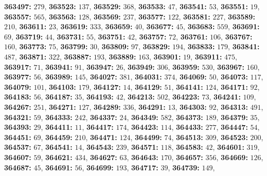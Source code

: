 \textsf{\bfseries 363497:} $279$, \textsf{\bfseries 363523:} $137$, \textsf{\bfseries 363529:} $368$, \textsf{\bfseries 363533:} $47$, \textsf{\bfseries 363541:} $53$, \textsf{\bfseries 363551:} $19$, \textsf{\bfseries 363557:} $565$, \textsf{\bfseries 363563:} $128$, \textsf{\bfseries 363569:} $237$, \textsf{\bfseries 363577:} $122$, \textsf{\bfseries 363581:} $227$, \textsf{\bfseries 363589:} $210$, \textsf{\bfseries 363611:} $23$, \textsf{\bfseries 363619:} $333$, \textsf{\bfseries 363659:} $40$, \textsf{\bfseries 363677:} $45$, \textsf{\bfseries 363683:} $559$, \textsf{\bfseries 363691:} $69$, \textsf{\bfseries 363719:} $44$, \textsf{\bfseries 363731:} $55$, \textsf{\bfseries 363751:} $42$, \textsf{\bfseries 363757:} $72$, \textsf{\bfseries 363761:} $106$, \textsf{\bfseries 363767:} $160$, \textsf{\bfseries 363773:} $75$, \textsf{\bfseries 363799:} $30$, \textsf{\bfseries 363809:} $97$, \textsf{\bfseries 363829:} $194$, \textsf{\bfseries 363833:} $179$, \textsf{\bfseries 363841:} $487$, \textsf{\bfseries 363871:} $322$, \textsf{\bfseries 363887:} $193$, \textsf{\bfseries 363889:} $163$, \textsf{\bfseries 363901:} $19$, \textsf{\bfseries 363911:} $475$, \textsf{\bfseries 363917:} $71$, \textsf{\bfseries 363941:} $91$, \textsf{\bfseries 363947:} $26$, \textsf{\bfseries 363949:} $306$, \textsf{\bfseries 363959:} $530$, \textsf{\bfseries 363967:} $160$, \textsf{\bfseries 363977:} $56$, \textsf{\bfseries 363989:} $145$, \textsf{\bfseries 364027:} $381$, \textsf{\bfseries 364031:} $374$, \textsf{\bfseries 364069:} $50$, \textsf{\bfseries 364073:} $117$, \textsf{\bfseries 364079:} $101$, \textsf{\bfseries 364103:} $179$, \textsf{\bfseries 364127:} $14$, \textsf{\bfseries 364129:} $51$, \textsf{\bfseries 364141:} $124$, \textsf{\bfseries 364171:} $92$, \textsf{\bfseries 364183:} $56$, \textsf{\bfseries 364187:} $35$, \textsf{\bfseries 364193:} $42$, \textsf{\bfseries 364213:} $502$, \textsf{\bfseries 364223:} $73$, \textsf{\bfseries 364241:} $109$, \textsf{\bfseries 364267:} $251$, \textsf{\bfseries 364271:} $127$, \textsf{\bfseries 364289:} $336$, \textsf{\bfseries 364291:} $13$, \textsf{\bfseries 364303:} $92$, \textsf{\bfseries 364313:} $491$, \textsf{\bfseries 364321:} $59$, \textsf{\bfseries 364333:} $242$, \textsf{\bfseries 364337:} $24$, \textsf{\bfseries 364349:} $582$, \textsf{\bfseries 364373:} $189$, \textsf{\bfseries 364379:} $35$, \textsf{\bfseries 364393:} $29$, \textsf{\bfseries 364411:} $11$, \textsf{\bfseries 364417:} $174$, \textsf{\bfseries 364423:} $114$, \textsf{\bfseries 364433:} $277$, \textsf{\bfseries 364447:} $54$, \textsf{\bfseries 364451:} $69$, \textsf{\bfseries 364459:} $210$, \textsf{\bfseries 364471:} $124$, \textsf{\bfseries 364499:} $74$, \textsf{\bfseries 364513:} $309$, \textsf{\bfseries 364523:} $200$, \textsf{\bfseries 364537:} $67$, \textsf{\bfseries 364541:} $14$, \textsf{\bfseries 364543:} $239$, \textsf{\bfseries 364571:} $118$, \textsf{\bfseries 364583:} $42$, \textsf{\bfseries 364601:} $319$, \textsf{\bfseries 364607:} $59$, \textsf{\bfseries 364621:} $434$, \textsf{\bfseries 364627:} $63$, \textsf{\bfseries 364643:} $170$, \textsf{\bfseries 364657:} $356$, \textsf{\bfseries 364669:} $126$, \textsf{\bfseries 364687:} $45$, \textsf{\bfseries 364691:} $56$, \textsf{\bfseries 364699:} $193$, \textsf{\bfseries 364717:} $39$, \textsf{\bfseries 364739:} $149$, 
